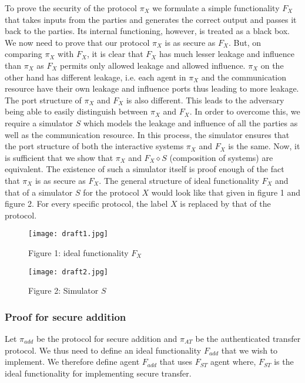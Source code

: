 \documentclass{llncs}
\begin{document}
To prove the security of the protocol $\pi_X$ we formulate a simple functionality $F_X$ that takes inputs from the parties and generates the correct output and passes it back to the parties. Its internal functioning, however, is treated as a black box. We now need to prove that our protocol $\pi_X$ is as secure as $F_X$. But, on comparing $\pi_X$ with $F_X$, it is clear that $F_X$ has much lesser leakage and influence than $\pi_X$ as $F_X$ permits only allowed leakage and allowed influence. $\pi_X$ on the other hand has different leakage, i.e. each agent in $\pi_X$ and the communication resource have their own leakage and influence ports thus leading to more leakage. The port structure of $\pi_X$ and $F_X$ is also different. This leads to the adversary being able to easily distinguish between $\pi_X$ and $F_X$. In order to overcome this, we require a simulator $S$ which models the leakage and influence of all the parties as well as the communication resource. In this process, the simulator ensures that the port structure of both the interactive systems $\pi_X$ and $F_X$ is the same. Now, it is sufficient that we show that $\pi_X$ and $F_X \diamond S$ (composition of systems) are equivalent. The existence of such a simulator itself is proof enough of the fact that $\pi_X$ is as secure as $F_X$. The general structure of ideal functionality $F_X$ and that of a simulator $S$ for the protocol $X$ would look like that given in figure 1 and figure 2. For every specific protocol, the label $X$ is replaced by that of the protocol. \\
\begin{figure}[h!]
\centering
\texttt{[image: draft1.jpg]} 
\caption{Figure 1: ideal functionality $F_X$}
\end{figure}

\begin{figure}[h!]
\centering
\texttt{[image: draft2.jpg]} 
\caption{Figure 2: Simulator $S$}
\end{figure}

\subsubsection{Proof for secure addition}
 Let $\pi_{add}$ be the protocol for secure addition and $\pi_{AT}$ be the authenticated transfer protocol. We thus need to define an ideal functionality $F_{add}$ that we wish to implement. We therefore define agent $F_{add}$ that uses $F_{ST}$ agent where, $F_{ST}$ is the ideal functionality for implementing secure transfer. \\ \\
\end{document}
